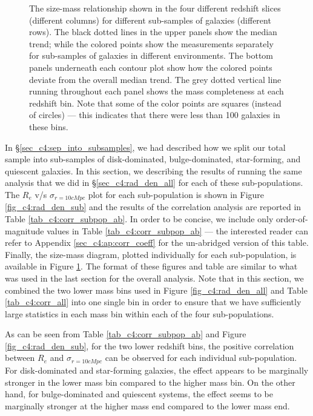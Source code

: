 \begin{figure}
    \begin{center}
  \end{center}
  \caption{The size-mass relationship shown in the four different redshift slices (different columns) for different sub-samples of galaxies (different rows). The black dotted lines in the upper panels show the median trend; while the colored points show the measurements separately for sub-samples of galaxies in different environments. The bottom panels underneath each contour plot show how the colored points deviate from the overall median trend. The grey dotted vertical line running throughout each panel shows the mass completeness at each redshift bin. Note that some of the color points are squares (instead of circles) --- this indicates that there were less than 100 galaxies in these bins.}
    \label{fig_c4:r_m_sub}
\end{figure}


In \S \ref{sec_c4:sep_into_subsamples}, we had described how we split our total sample into sub-samples of disk-dominated, bulge-dominated, star-forming, and quiescent galaxies. In this section, we describing the results of running the same analysis that we did in \S \ref{sec_c4:rad_den_all} for each of these sub-populations. The $R_e$ v/s $\sigma_{r=10cMpc}$ plot for each sub-population is shown in Figure \ref{fig_c4:rad_den_sub} and the results of the correlation analysis are reported in Table \ref{tab_c4:corr_subpop_ab}. In order to be concise, we include only order-of-magnitude values in Table \ref{tab_c4:corr_subpop_ab} --- the interested reader can refer to Appendix \ref{sec_c4:ap:corr_coeff} for the un-abridged version of this table. Finally, the size-mass diagram, plotted individually for each sub-population, is available in Figure \ref{fig_c4:r_m_sub}. The format of these figures and table are similar to what was used in the last section for the overall analysis. Note that in this section, we combined the two lower mass bins used in Figure \ref{fig_c4:rad_den_all} and Table \ref{tab_c4:corr_all} into one single bin in order to ensure that we have sufficiently large statistics in each mass bin within each of the four sub-populations.

As can be seen from Table \ref{tab_c4:corr_subpop_ab} and Figure \ref{fig_c4:rad_den_sub}, for the two lower redshift bins, the positive correlation between $R_e$ and $\sigma_{r=10cMpc}$ can be observed for each individual sub-population. For disk-dominated and star-forming galaxies, the effect appears to be marginally stronger in the lower mass bin compared to the higher mass bin. On the other hand, for bulge-dominated and quiescent systems, the effect seems to be marginally stronger at the higher mass end compared to the lower mass end. 

